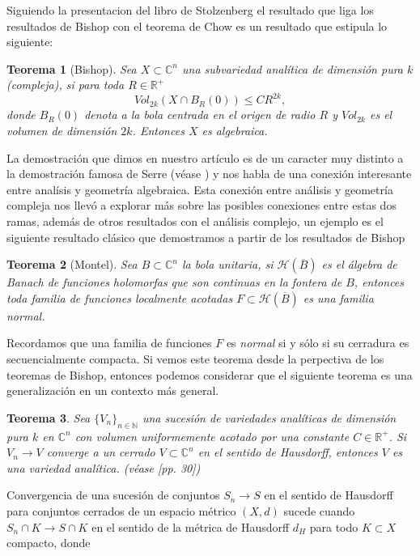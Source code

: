 \documentclass[letterpaper]{report}
\newtheorem{teorema}{Teorema}[chapter]
\newcommand{\nat}{\ensuremath{ \mathbb N }}
\newcommand{\con}{\ensuremath{\mathbb{C}^n}}
\newcommand{\re}{\ensuremath{\mathbb R }}
\begin{document}
Siguiendo la presentacion del libro de Stolzenberg \cite{Stolzenberg} el resultado que liga 
los resultados de Bishop con el teorema de Chow es un resultado que estipula lo siguiente:
\begin{teorema}[Bishop]\label{Bishop1}
        Sea $X\subset\con$ una subvariedad anal\'itica de dimensi\'on pura $k$ (compleja), si para toda $R\in\re^+$
        $$Vol_{2k}(X\cap B_R(0))\leq CR^{2k},$$
        donde $B_R(0)$ denota a la bola centrada en el origen de radio $R$ y $Vol_{2k}$ es el volumen de dimensi\'on $2k$. 
        Entonces $X$ es algebraica.
\end{teorema}
\noindent La demostraci\'on que dimos en nuestro art\'iculo es de un caracter muy distinto a la demostraci\'on famosa de
Serre (v\'ease \cite{GAGA}) y nos habla de una conexi\'on interesante entre anal\'isis y geometr\'ia algebraica.
Esta conexi\'on entre an\'alisis y geometr\'ia compleja nos llev\'o a explorar m\'as sobre las posibles conexiones entre estas dos ramas,
adem\'as de otros resultados con el an\'alisis complejo, un ejemplo es el siguiente resultado cl\'asico que demostramos
a partir de los resultados de Bishop 
\begin{teorema}[Montel]\label{Montel}
        Sea $B\subset\con$ la bola unitaria, si $\mathcal{H}(\overline{B})$ es el \'algebra de Banach de funciones holomorfas que son continuas 
        en la fontera de $B$, entonces toda familia de funciones localmente acotadas $F\subset\mathcal{H}(\overline{B})$ es una familia \textit{normal}.
\end{teorema}
Recordamos que una familia de funciones $F$ es \textit{normal} si y s\'olo si su cerradura es secuencialmente compacta. Si vemos este 
teorema desde la perpectiva de los teoremas de Bishop, entonces podemos considerar que el siguiente teorema es una generalizaci\'on en
un contexto m\'as general.
\begin{teorema}\label{Bishop2}
        Sea $\{ V_n \}_{n\in\nat}$ una sucesi\'on de variedades anal\'iticas de dimensi\'on pura $k$ en $\con$ con volumen uniformemente
        acotado por una constante $C\in\re^{+}$. Si $V_n\rightarrow V$ converge a un cerrado $V\subset\con$ en el sentido de Hausdorff, entonces 
        $V$ es una variedad anal\'itica. (v\'ease \cite{Stolzenberg}[pp. 30])
\end{teorema}
Convergencia de una sucesi\'on de conjuntos $S_n\rightarrow S$ en el sentido de Hausdorff para conjuntos cerrados de un espacio m\'etrico $(X,d)$
sucede cuando $S_n\cap K\rightarrow S\cap K$ en el sentido de la m\'etrica de Hausdorff $d_H$ para todo $K\subset X$ compacto, donde
\end{document}
